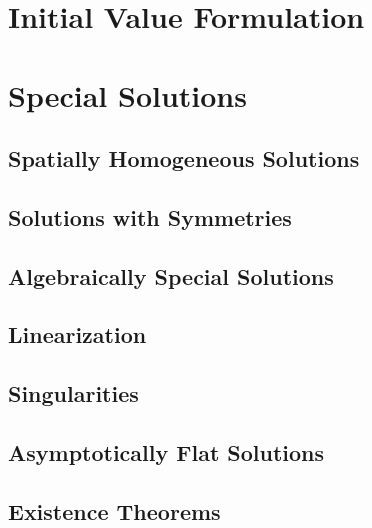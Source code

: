 \documentclass[12pt]{article}
\begin{document}
\section{Initial Value Formulation}

\section{Special Solutions}

\subsection{Spatially Homogeneous Solutions}

\subsection{Solutions with Symmetries}

\subsection{Algebraically Special Solutions}

\subsection{Linearization}

\subsection{Singularities}

\subsection{Asymptotically Flat Solutions}

\subsection{Existence Theorems}

\end{document}
